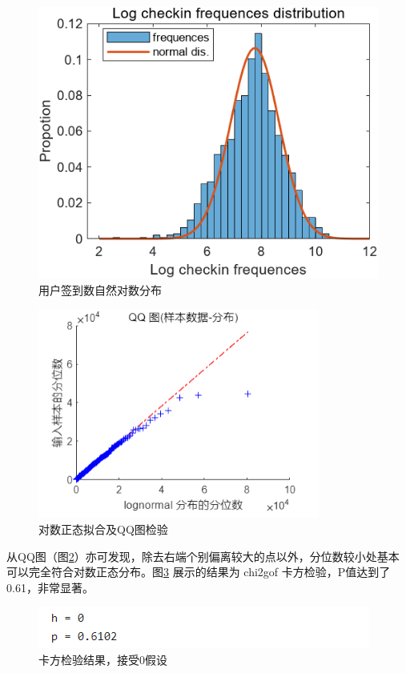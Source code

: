 \documentclass[UTF8]{ctexart}
\begin{document}
		\begin{figure}[H]
			\centering
			\includegraphics{logcheckinDis.png}
			\caption{用户签到数自然对数分布}
			\label{logdis}
		\end{figure}
		\begin{figure}[H]
			\centering
			\includegraphics{qq.png}
			\caption{对数正态拟合及QQ图检验}
			\label{qq}
		\end{figure}
		
		从QQ图（图\ref{qq}）亦可发现，除去右端个别偏离较大的点以外，分位数较小处基本可以完全符合对数正态分布。图\ref{chi2} 展示的结果为 chi2gof 卡方检验，P值达到了0.61，非常显著。
		
		\begin{figure}[H]
			\centering
			\includegraphics{chi2.png}
			\caption{卡方检验结果，接受0假设}
			\label{chi2}
		\end{figure}
		
\end{document}
